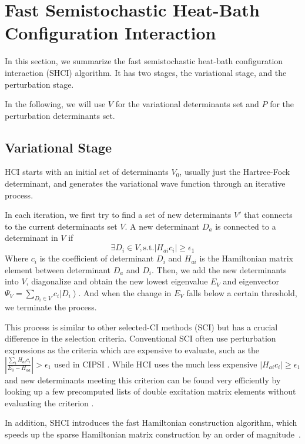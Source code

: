 \section{Fast Semistochastic Heat-Bath Configuration Interaction}
\label{SHCI}

In this section, we summarize the fast semistochastic heat-bath configuration interaction (SHCI) algorithm.
It has two stages, the variational stage, and the perturbation stage.

In the following, we will use $V$ for the variational determinants set and $P$ for the perturbation determinants set.

\subsection{Variational Stage}
HCI starts with an initial set of determinants $V_0$, usually just the Hartree-Fock determinant, and generates the variational wave function through an iterative process.

In each iteration, we first try to find a set of new determinants $V'$ that connects to the current determinants set $V$.
A new determinant $D_a$ is connected to a determinant in $V$ if
$$\exists D _{i} \in V , \mathrm{s . t .} \left|H _{a i} c _{i}\right| \ge \epsilon _{1}$$
Where $c_i$ is the coefficient of determinant $D_i$ and $H_{ai}$ is the Hamiltonian matrix element between determinant $D_a$ and $D_i$.
Then, we add the new determinants into $V$, diagonalize and obtain the new lowest eigenvalue $E_{V}$ and eigenvector $\Psi _{V} = \sum _{D _{i} \in V} c _{i} \left|D _{i}\right\rangle$.
And when the change in $E_V$ falls below a certain threshold, we terminate the process.

This process is similar to other selected-CI methods (SCI) but has a crucial difference in the selection criteria.
Conventional SCI often use perturbation expressions as the criteria which are expensive to evaluate, such as the $\left|\frac{\sum _{i} H _{a i} c _{i}}{E _{0} - H _{a a}}\right| > \epsilon _{1}$ used in CIPSI \cite{huron1973iterative}.
While HCI uses the much less expensive $\left|H _{a i} c _{i}\right| \ge \epsilon _{1}$ and new determinants meeting this criterion can be found very efficiently by looking up a few precomputed lists of double excitation matrix elements without evaluating the criterion \cite{holmes2016heat}.

In addition, SHCI introduces the fast Hamiltonian construction algorithm, which speeds up the sparse Hamiltonian matrix construction by an order of magnitude~\cite{li2018fast}.

